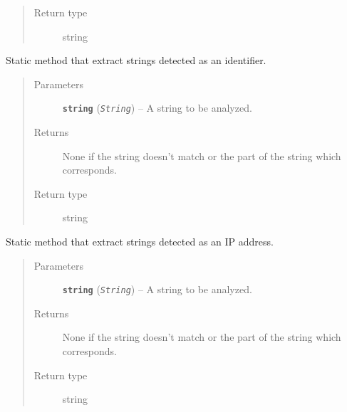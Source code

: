 \documentclass[letterpaper,10pt,oneside]{sphinxmanual}
\begin{document}
\begin{fulllineitems}
\begin{fulllineitems}
\begin{quote}
\begin{description}
\item[{Return type}] \leavevmode
string

\end{description}\end{quote}

\end{fulllineitems}


\begin{fulllineitems}
\label{index:lib.parser.Parser.getId}
Static method that extract strings detected as an identifier.
\begin{quote}\begin{description}
\item[{Parameters}] \leavevmode
\textbf{\texttt{string}} (\emph{\texttt{String}}) -- A string to be analyzed.

\item[{Returns}] \leavevmode
None if the string doesn't match or the part of the string
which corresponds.

\item[{Return type}] \leavevmode
string

\end{description}\end{quote}

\end{fulllineitems}


\begin{fulllineitems}
\label{index:lib.parser.Parser.getIp}
Static method that extract strings detected as an IP address.
\begin{quote}\begin{description}
\item[{Parameters}] \leavevmode
\textbf{\texttt{string}} (\emph{\texttt{String}}) -- A string to be analyzed.

\item[{Returns}] \leavevmode
None if the string doesn't match or the part of the string
which corresponds.

\item[{Return type}] \leavevmode
string

\end{description}\end{quote}


\end{fulllineitems}
\end{fulllineitems}
\end{document}
